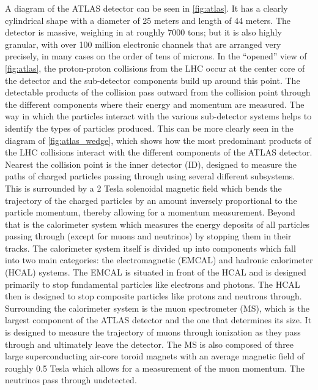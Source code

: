 A diagram of the ATLAS detector can be seen in \fig\ref{fig:atlas}.
It has a clearly cylindrical shape with a diameter of 25 meters
and length of 44 meters. The detector is massive, weighing
in at roughly 7000 tons; but it is also highly granular, with
over 100 million electronic channels that are arranged very precisely, 
in many cases on the order of tens of microns.
In the ``opened'' view of \fig\ref{fig:atlas}, the proton-proton
collisions from the LHC occur at the center core of the detector
and the sub-detector components build up around this point.
The detectable products of the collision pass outward from the collision
point through the different components where their energy and momentum
are measured. The way in which the particles interact with the various
sub-detector systems helps to identify the types of 
particles produced.
This can be more clearly seen in the diagram of 
\fig\ref{fig:atlas_wedge}, which shows how the most predominant
products of the LHC collisions interact with the different
components of the ATLAS detector.
Nearest the collision point is the inner detector (ID), designed to 
measure the paths of charged particles passing through using several
different subsystems. This 
is surrounded by a 2 Tesla solenoidal magnetic field which 
bends the trajectory of the charged particles by an amount
inversely proportional to the particle momentum, thereby allowing
for a momentum measurement.  Beyond that is the calorimeter system
which measures the energy deposits of all particles passing 
through (except for muons and neutrinos) by stopping them in their 
tracks. The calorimeter system 
itself is divided up into components which fall into two main 
categories: the electromagnetic (EMCAL)
and hadronic calorimeter (HCAL) systems.
The EMCAL is situated in front of the HCAL and is designed
primarily to stop fundamental particles like electrons and photons. 
The HCAL then is designed to stop
composite particles like protons and neutrons through.
Surrounding the calorimeter system is the muon spectrometer (MS),
which is the largest component of the ATLAS detector and the one
that determines its size. It is designed to measure the 
trajectory of muons through ionization as they pass through
and ultimately leave the detector. The MS is also composed of 
three large superconducting air-core toroid magnets with an 
average magnetic field of roughly 0.5 Tesla which allows for
a measurement of the muon momentum. The neutrinos 
pass through undetected.

